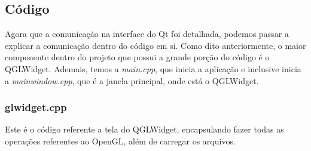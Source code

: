 \subsection{Código}

Agora que a comunicação na interface do Qt foi detalhada,
podemos passar a explicar a comunicação dentro do código em si. Como dito 
anteriormente, o maior componente dentro do projeto que possui a grande porção
do código é o QGLWidget. Ademais, temos a \emph{main.cpp}, que inicia a aplicação e 
inclusive inicia a \emph{mainwindow.cpp}, que é a janela principal, onde está o QGLWidget.

\subsubsection{glwidget.cpp}

Este é o código referente a tela do QGLWidget, encapsulando fazer todas as operações 
referentes ao OpenGL, além de carregar os arquivos.






